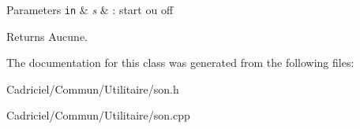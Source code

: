 \begin{DoxyParams}[1]{Parameters}
\mbox{\tt in}  & {\em s} & \+: start ou off\\
\hline
\end{DoxyParams}
\begin{DoxyReturn}{Returns}
Aucune. 
\end{DoxyReturn}


The documentation for this class was generated from the following files\+:\begin{DoxyCompactItemize}
\item 
Cadriciel/\+Commun/\+Utilitaire/son.\+h\item 
Cadriciel/\+Commun/\+Utilitaire/son.\+cpp\end{DoxyCompactItemize}
